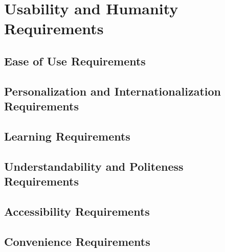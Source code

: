 \section{Usability and Humanity Requirements}
\subsection{Ease of Use Requirements}
\subsection{Personalization and Internationalization Requirements}
\subsection{Learning Requirements}
\subsection{Understandability and Politeness Requirements}
\subsection{Accessibility Requirements}
\subsection{Convenience Requirements}
